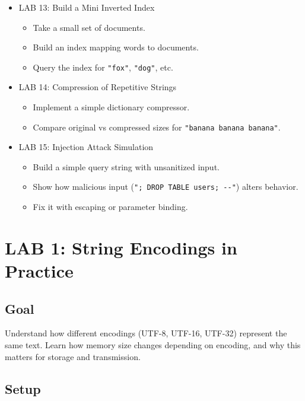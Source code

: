 \documentclass[
  letterpaper,
  DIV=11,
  numbers=noendperiod]{scrreprt}
\providecommand{\tightlist}{%
  \setlength{\itemsep}{0pt}\setlength{\parskip}{0pt}}
\begin{document}
\begin{itemize}
\item
  LAB 13: Build a Mini Inverted Index

  \begin{itemize}
  \tightlist
  \item
    Take a small set of documents.
  \item
    Build an index mapping words to documents.
  \item
    Query the index for \texttt{"fox"}, \texttt{"dog"}, etc.
  \end{itemize}
\item
  LAB 14: Compression of Repetitive Strings

  \begin{itemize}
  \tightlist
  \item
    Implement a simple dictionary compressor.
  \item
    Compare original vs compressed sizes for
    \texttt{"banana\ banana\ banana"}.
  \end{itemize}
\item
  LAB 15: Injection Attack Simulation

  \begin{itemize}
  \tightlist
  \item
    Build a simple query string with unsanitized input.
  \item
    Show how malicious input
    (\texttt{"\textquotesingle{};\ DROP\ TABLE\ users;\ -\/-"}) alters
    behavior.
  \item
    Fix it with escaping or parameter binding.
  \end{itemize}
\end{itemize}

\section{LAB 1: String Encodings in
Practice}\label{lab-1-string-encodings-in-practice}

\subsection{Goal}\label{goal}

Understand how different encodings (UTF-8, UTF-16, UTF-32) represent the
same text. Learn how memory size changes depending on encoding, and why
this matters for storage and transmission.

\subsection{Setup}\label{setup}
\end{document}
